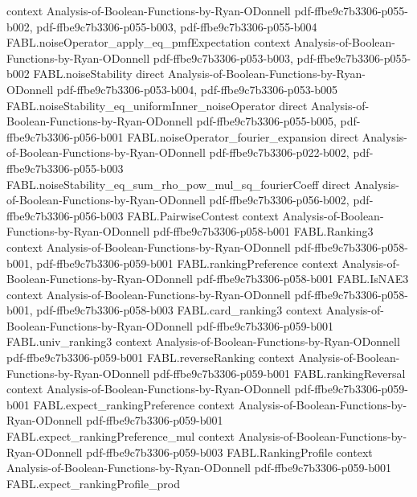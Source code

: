 \begin{theorem}
  {context}
  {Analysis-of-Boolean-Functions-by-Ryan-ODonnell}
  {pdf-ffbe9c7b3306-p055-b002,
    pdf-ffbe9c7b3306-p055-b003,
    pdf-ffbe9c7b3306-p055-b004}
\proofstep
  {FABL.noiseOperator_apply_eq_pmfExpectation}
  {context}
  {Analysis-of-Boolean-Functions-by-Ryan-ODonnell}
  {pdf-ffbe9c7b3306-p053-b003,
    pdf-ffbe9c7b3306-p055-b002}
\proofstep
  {FABL.noiseStability}
  {direct}
  {Analysis-of-Boolean-Functions-by-Ryan-ODonnell}
  {pdf-ffbe9c7b3306-p053-b004,
    pdf-ffbe9c7b3306-p053-b005}
\proofstep
  {FABL.noiseStability_eq_uniformInner_noiseOperator}
  {direct}
  {Analysis-of-Boolean-Functions-by-Ryan-ODonnell}
  {pdf-ffbe9c7b3306-p055-b005,
    pdf-ffbe9c7b3306-p056-b001}
\proofstep
  {FABL.noiseOperator_fourier_expansion}
  {direct}
  {Analysis-of-Boolean-Functions-by-Ryan-ODonnell}
  {pdf-ffbe9c7b3306-p022-b002,
    pdf-ffbe9c7b3306-p055-b003}
\proofstep
  {FABL.noiseStability_eq_sum_rho_pow_mul_sq_fourierCoeff}
  {direct}
  {Analysis-of-Boolean-Functions-by-Ryan-ODonnell}
  {pdf-ffbe9c7b3306-p056-b002,
    pdf-ffbe9c7b3306-p056-b003}
\proofstep
  {FABL.PairwiseContest}
  {context}
  {Analysis-of-Boolean-Functions-by-Ryan-ODonnell}
  {pdf-ffbe9c7b3306-p058-b001}
\proofstep
  {FABL.Ranking3}
  {context}
  {Analysis-of-Boolean-Functions-by-Ryan-ODonnell}
  {pdf-ffbe9c7b3306-p058-b001,
    pdf-ffbe9c7b3306-p059-b001}
\proofstep
  {FABL.rankingPreference}
  {context}
  {Analysis-of-Boolean-Functions-by-Ryan-ODonnell}
  {pdf-ffbe9c7b3306-p058-b001}
\proofstep
  {FABL.IsNAE3}
  {context}
  {Analysis-of-Boolean-Functions-by-Ryan-ODonnell}
  {pdf-ffbe9c7b3306-p058-b001,
    pdf-ffbe9c7b3306-p058-b003}
\proofstep
  {FABL.card_ranking3}
  {context}
  {Analysis-of-Boolean-Functions-by-Ryan-ODonnell}
  {pdf-ffbe9c7b3306-p059-b001}
\proofstep
  {FABL.univ_ranking3}
  {context}
  {Analysis-of-Boolean-Functions-by-Ryan-ODonnell}
  {pdf-ffbe9c7b3306-p059-b001}
\proofstep
  {FABL.reverseRanking}
  {context}
  {Analysis-of-Boolean-Functions-by-Ryan-ODonnell}
  {pdf-ffbe9c7b3306-p059-b001}
\proofstep
  {FABL.rankingReversal}
  {context}
  {Analysis-of-Boolean-Functions-by-Ryan-ODonnell}
  {pdf-ffbe9c7b3306-p059-b001}
\proofstep
  {FABL.expect_rankingPreference}
  {context}
  {Analysis-of-Boolean-Functions-by-Ryan-ODonnell}
  {pdf-ffbe9c7b3306-p059-b001}
\proofstep
  {FABL.expect_rankingPreference_mul}
  {context}
  {Analysis-of-Boolean-Functions-by-Ryan-ODonnell}
  {pdf-ffbe9c7b3306-p059-b003}
\proofstep
  {FABL.RankingProfile}
  {context}
  {Analysis-of-Boolean-Functions-by-Ryan-ODonnell}
  {pdf-ffbe9c7b3306-p059-b001}
\proofstep
  {FABL.expect_rankingProfile_prod}

\end{theorem}
